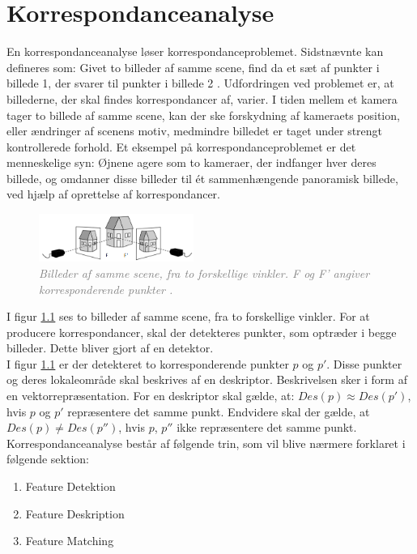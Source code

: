 \chapter{Korrespondanceanalyse} \label{sec:Kor}
En korrespondanceanalyse løser korrespondanceproblemet. Sidstnævnte kan defineres som: Givet to billeder af samme scene, find da et sæt af punkter i billede 1, der svarer til punkter i billede 2 \cite{Stefano}. Udfordringen ved problemet er, at billederne, der skal findes korrespondancer af, varier. I tiden mellem et kamera tager to billede af samme scene, kan der ske forskydning af kameraets position, eller ændringer af scenens motiv, medmindre billedet er taget under strengt kontrollerede forhold. 
Et eksempel på korrespondanceproblemet er det menneskelige syn: Øjnene agere som to kameraer, der indfanger  hver deres billede, og omdanner disse billeder til ét sammenhængende panoramisk billede, ved hjælp af oprettelse af korrespondancer. \\
\begin{figure}[H]
    \centering
    \includegraphics[width=0.45\textwidth]{fig/3.png}
     \vspace{-1em}
    \begin{center}    
       \caption{\textcolor{gray}{\footnotesize \textit{Billeder af samme scene, fra to forskellige vinkler. F og F' angiver korresponderende punkter \cite{kim}.}}}
    \label{fig:1}
     \end{center}
     \vspace{-2.5em}
  \end{figure} \noindent
I figur \ref{fig:1} ses to billeder af samme scene, fra to forskellige vinkler. For at producere korrespondancer, skal der detekteres punkter, som optræder i begge billeder. Dette bliver gjort af en detektor. 
\\
I figur \ref{fig:1} er der detekteret to korresponderende punkter $p$ og $p'$. Disse punkter og deres lokaleområde skal beskrives af en deskriptor. Beskrivelsen sker i form af en vektorrepræsentation. 
For en deskriptor skal gælde, at: $Des(p)\approx Des(p')$, hvis $p$ og $p'$ repræsentere det samme punkt. Endvidere skal der gælde, at $Des(p)\neq Des(p'')$, hvis $p$, $p''$ ikke repræsentere det samme punkt. \\
Korrespondanceanalyse består af følgende trin, som vil blive nærmere forklaret i følgende sektion:
\begin{enumerate}
\item{Feature Detektion}
\item{Feature Deskription}
\item{Feature Matching}
\end{enumerate}


